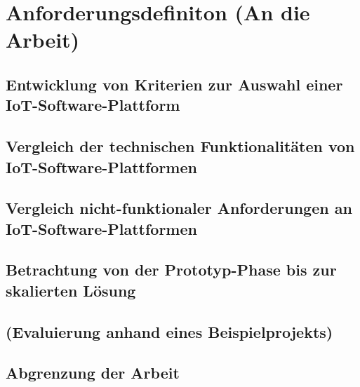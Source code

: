 \chapter{Anforderungsdefiniton (An die Arbeit)}\label{ch:Anforderungsdefiniton (An die Arbeit)}
\section{Entwicklung von Kriterien zur Auswahl einer IoT-Software-Plattform}\label{sec:Entwicklung von Kriterien zur Auswahl einer IoT-Software-Plattform}
\section{Vergleich der technischen Funktionalitäten von IoT-Software-Plattformen}\label{sec:Vergleich der technischen Funktionalitäten von IoT-Software-Plattformen}
\section{Vergleich nicht-funktionaler Anforderungen an IoT-Software-Plattformen}\label{sec:Vergleich nicht-funktionaler Anforderungen an IoT-Software-Plattformen}
\section{Betrachtung von der Prototyp-Phase bis zur skalierten Lösung}\label{sec:Betrachtung von der Prototyp-Phase bis zur skalierten Lösung}
\section{(Evaluierung anhand eines Beispielprojekts)}\label{sec:(Evaluierung anhand eines Beispielprojekts)}
\section{Abgrenzung der Arbeit}\label{sec:Abgrenzung der Arbeit}
